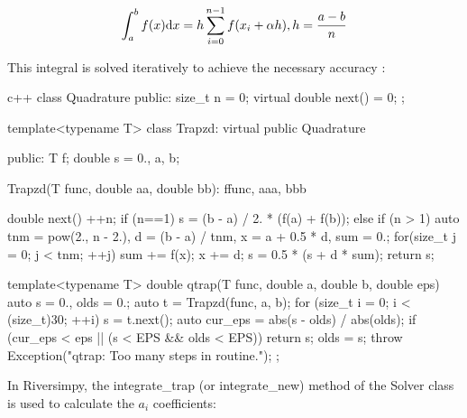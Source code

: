 \documentclass[]{pracamgr}
\begin{document}
      \begin{equation}
        \label{numerical_integral}
        \int^{b}_{a} f(x) \textrm{d} x = h \sum_{i = 0}^{n - 1} f(x_i + \alpha h),    \\
        h = \frac{a - b}{n}  
      \end{equation}

      This integral is solved iteratively to achieve the necessary accuracy \cite{Press2007}:

      \begin{mintedbox}{c++}
        class Quadrature {
            public:
                size_t n = 0;
                virtual double next() = 0; };

        template<typename T> class Trapzd: virtual public Quadrature {
            public:
                T f;
                double s = 0., a, b;

                Trapzd(T func, double aa, double bb):
                    f{func}, a{aa}, b{bb} {}

                double next(){
                    ++n;
                    if (n==1) s = (b - a) / 2. * (f(a) + f(b));
                    else if (n > 1) {
                        auto tnm = pow(2., n - 2.), d = (b - a) / tnm, x = a + 0.5 * d, sum = 0.;
                        for(size_t j = 0; j < tnm; ++j) {
                            sum += f(x); x += d;
                        }
                        s = 0.5 * (s + d * sum);
                    }
                    return s;
                }
        }
        
        template<typename T> double qtrap(T func, double a, double b, double eps){
            auto s = 0., olds = 0.;
            auto t = Trapzd(func, a, b);
            for (size_t i = 0; i < (size_t)30; ++i) {
                s = t.next();
                auto cur_eps = abs(s - olds) / abs(olds);
                if (cur_eps < eps || (s < EPS && olds < EPS))
                    return s;
                olds = s;
            }
            throw Exception("qtrap: Too many steps in routine.");
        };\end{mintedbox}

        In Riversimpy, the integrate\_trap (or integrate\_new) method of the Solver class is used to calculate the $a_i$ coefficients:
        
\end{document}

